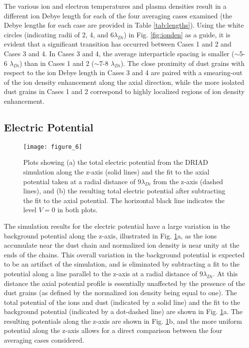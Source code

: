 \documentclass[aip,amsmath,amssymb,graphicx,floatfix,reprint]{revtex4-1}
\begin{document}
The various ion and electron temperatures and plasma densities result in a different ion Debye length for each of the four averaging cases examined (the Debye lengths for each case are provided in Table \ref{tab:lengths}).  Using the white circles (indicating radii of 2, 4, and 6$\lambda_{Di}$) in Fig. \ref{fig:ionden} as a guide, it is evident that a significant transition has occurred between Cases 1 and 2 and Cases 3 and 4.  In Cases 3 and 4, the average interparticle spacing is smaller ($\sim$5-6 $\lambda_{Di}$) than in Cases 1 and 2 ($\sim$7-8 $\lambda_{Di}$).  The close proximity of dust grains with respect to the ion Debye length in Cases 3 and 4 are paired with a smearing-out of the ion density enhancement along the axial direction, while the more isolated dust grains in Cases 1 and 2 correspond to highly localized regions of ion density enhancement.

\subsection{Electric Potential}
\label{electricpotential}

\begin{figure}[b]
\texttt{[image: figure\_6]}
\caption{Plots showing (a) the total electric potential from the DRIAD simulation along the z-axis (solid lines) and the fit to the axial potential taken at a radial distance of $9\lambda_{Di}$ from the z-axis (dashed lines), and (b) the resulting total electric potential after subtracting the fit to the axial potential.  The horizontal black line indicates the level $V=0$ in both plots.}
\label{fig:roll_calcs}
\end{figure}

 The simulation results for the electric potential have a large variation in the background potential along the z-axis, illustrated in Fig. \ref{fig:roll_calcs}a, as the ions accumulate near the dust chain and normalized ion density is near unity at the ends of the chains. This overall variation in the background potential is expected to be an artifact of the simulation, and is eliminated by subtracting a fit to the potential along a line parallel to the z-axis at a radial distance of $9\lambda_{Di}$.  At this distance the axial potential profile is essentially unaffected by the presence of the dust grains (as defined by the normalized ion density being equal to one).  The total potential of the ions and dust (indicated by a solid line) and the fit to the background potential (indicated by a dot-dashed line) are shown in Fig. \ref{fig:roll_calcs}a.  The resulting potentials along the z-axis are shown in Fig. \ref{fig:roll_calcs}b, and the more uniform potential along the z-axis allows for a direct comparison between the four averaging cases considered.
 
\end{document}
